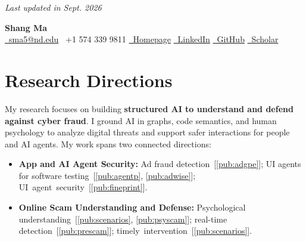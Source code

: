\documentclass[10pt,letterpaper]{article}
\newenvironment{sectionbody}{\begin{list}{}{\setlength{\leftmargin}{12pt}\setlength{\rightmargin}{0pt}\setlength{\topsep}{0pt}\setlength{\partopsep}{0pt}\setlength{\parsep}{0pt}\setlength{\itemsep}{0pt}}\item[]}{\end{list}}
\begin{document}
\begin{flushright}\small\color{gray}\textit{Last updated in Sept. 2026}\end{flushright}
\vspace{-17pt}
\begin{center}
{\fontsize{24}{28}\selectfont\bfseries Shang Ma}\\[6pt]
\normalsize
\href{mailto:sma5@nd.edu}{\faEnvelope\ sma5@nd.edu}\quad
\faPhone\ +1 574 339 9811\quad
\href{https://shangma.org}{\faLink\ Homepage}\quad
\href{https://www.linkedin.com/in/shang-ma-891898255/}{\faLinkedinIn\ LinkedIn}\quad
\href{https://github.com/KiteFlyKid}{\faGithub\ GitHub}\quad
\href{https://scholar.google.com/citations?user=kF1a5fqkO_EC}{\faGraduationCap\ Scholar}
\end{center}
\vspace{-9pt}
\section{Research Directions}
\begin{sectionbody}
My research focuses on building \textbf{structured AI to understand and defend against cyber fraud}. I ground AI in graphs, code semantics, and human psychology to analyze digital threats and support safer interactions for people and AI agents. My work spans two connected directions:
\begin{itemize}\raggedright
\item \textbf{App and AI Agent Security:} Ad fraud detection~[\ref{pub:adgpe}]; UI agents for software testing~[\ref{pub:agentp}, \ref{pub:adwise}]; \mbox{UI agent security~[\ref{pub:fineprint}]}.
\item \textbf{Online Scam Understanding and Defense:} Psychological understanding~[\ref{pub:scenarios}, \ref{pub:psyscam}]; real-time detection~[\ref{pub:prescam}]; \mbox{timely intervention~[\ref{pub:scenarios}]}.
\end{itemize}
\end{sectionbody}
\end{document}
